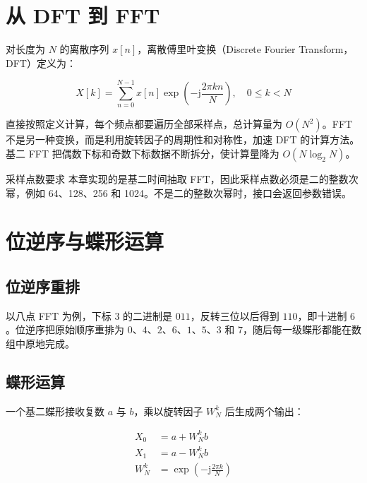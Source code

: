 \section{从 DFT 到 FFT}

对长度为 $N$ 的离散序列 $x[n]$，离散傅里叶变换（Discrete Fourier Transform，DFT）定义为：

\begin{equation}
X[k]=\sum_{n=0}^{N-1}x[n]\exp\left(-\mathrm{j}\frac{2\pi kn}{N}\right),\quad 0\leq k<N
\label{eq:dft}
\end{equation}

直接按照定义计算，每个频点都要遍历全部采样点，总计算量为 $O(N^2)$。FFT 不是另一种变换，而是利用旋转因子的周期性和对称性，加速 DFT 的计算方法。基二 FFT 把偶数下标和奇数下标数据不断拆分，使计算量降为 $O(N\log_2N)$。

\begin{anybox}{采样点数要求}
本章实现的是基二时间抽取 FFT，因此采样点数必须是二的整数次幂，例如 64、128、256 和 1024。不是二的整数次幂时，接口会返回参数错误。
\end{anybox}

\section{位逆序与蝶形运算}

\subsection{位逆序重排}

以八点 FFT 为例，下标 $3$ 的二进制是 $011$，反转三位以后得到 $110$，即十进制 $6$。位逆序把原始顺序重排为 $0$、$4$、$2$、$6$、$1$、$5$、$3$ 和 $7$，随后每一级蝶形都能在数组中原地完成。

\subsection{蝶形运算}

一个基二蝶形接收复数 $a$ 与 $b$，乘以旋转因子 $W_N^k$ 后生成两个输出：

\begin{align}
X_0 &= a+W_N^kb \\
X_1 &= a-W_N^kb \\
W_N^k &= \exp\left(-\mathrm{j}\frac{2\pi k}{N}\right)
\label{eq:fft-butterfly}
\end{align}

